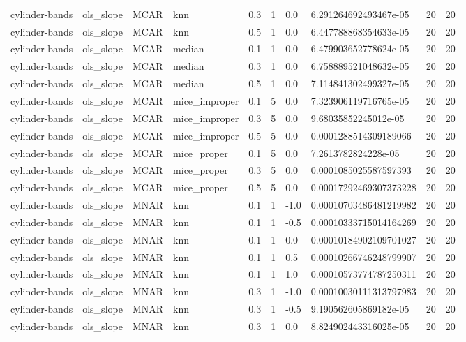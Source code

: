 \begin{tabular}{llllllllll}
cylinder-bands & ols\_slope & MCAR & knn & 0.3 & 1 & 0.0 & 6.291264692493467e-05 & 20 & 20 \\
cylinder-bands & ols\_slope & MCAR & knn & 0.5 & 1 & 0.0 & 6.447788868354633e-05 & 20 & 20 \\
cylinder-bands & ols\_slope & MCAR & median & 0.1 & 1 & 0.0 & 6.479903652778624e-05 & 20 & 20 \\
cylinder-bands & ols\_slope & MCAR & median & 0.3 & 1 & 0.0 & 6.758889521048632e-05 & 20 & 20 \\
cylinder-bands & ols\_slope & MCAR & median & 0.5 & 1 & 0.0 & 7.114841302499327e-05 & 20 & 20 \\
cylinder-bands & ols\_slope & MCAR & mice\_improper & 0.1 & 5 & 0.0 & 7.323906119716765e-05 & 20 & 20 \\
cylinder-bands & ols\_slope & MCAR & mice\_improper & 0.3 & 5 & 0.0 & 9.68035852245012e-05 & 20 & 20 \\
cylinder-bands & ols\_slope & MCAR & mice\_improper & 0.5 & 5 & 0.0 & 0.0001288514309189066 & 20 & 20 \\
cylinder-bands & ols\_slope & MCAR & mice\_proper & 0.1 & 5 & 0.0 & 7.2613782824228e-05 & 20 & 20 \\
cylinder-bands & ols\_slope & MCAR & mice\_proper & 0.3 & 5 & 0.0 & 0.0001085025587597393 & 20 & 20 \\
cylinder-bands & ols\_slope & MCAR & mice\_proper & 0.5 & 5 & 0.0 & 0.00017292469307373228 & 20 & 20 \\
cylinder-bands & ols\_slope & MNAR & knn & 0.1 & 1 & -1.0 & 0.00010703486481219982 & 20 & 20 \\
cylinder-bands & ols\_slope & MNAR & knn & 0.1 & 1 & -0.5 & 0.00010333715014164269 & 20 & 20 \\
cylinder-bands & ols\_slope & MNAR & knn & 0.1 & 1 & 0.0 & 0.00010184902109701027 & 20 & 20 \\
cylinder-bands & ols\_slope & MNAR & knn & 0.1 & 1 & 0.5 & 0.00010266746248799907 & 20 & 20 \\
cylinder-bands & ols\_slope & MNAR & knn & 0.1 & 1 & 1.0 & 0.00010573774787250311 & 20 & 20 \\
cylinder-bands & ols\_slope & MNAR & knn & 0.3 & 1 & -1.0 & 0.00010030111313797983 & 20 & 20 \\
cylinder-bands & ols\_slope & MNAR & knn & 0.3 & 1 & -0.5 & 9.190562605869182e-05 & 20 & 20 \\
cylinder-bands & ols\_slope & MNAR & knn & 0.3 & 1 & 0.0 & 8.824902443316025e-05 & 20 & 20 \\

\end{tabular}
